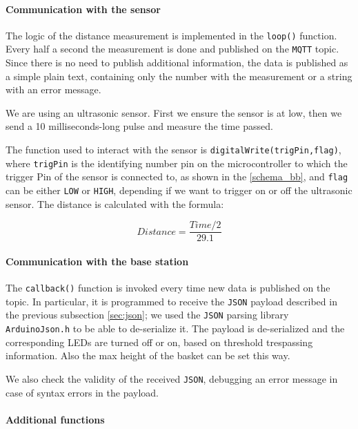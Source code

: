 \documentclass{article}
\begin{document}
\paragraph{Communication with the sensor}\mbox{}

The logic of the distance measurement is implemented in the \verb|loop()|
function. Every half a second the measurement is done and published on the
\texttt{MQTT} topic. Since there is no need to publish additional information, the
data is published as a simple plain text, containing only the number with the
measurement or a string with an error message.

We are using an ultrasonic sensor. First we ensure the sensor is at low, then we
send a 10 milliseconds-long pulse and measure the time passed.

The function used to interact with the sensor is
\verb|digitalWrite(trigPin,flag)|,
where \texttt{trigPin} is the identifying number pin on the
microcontroller to which the trigger Pin of the sensor is connected to, as shown in the \ref{schema_bb}, and \texttt{flag} can be either \texttt{LOW} or \texttt{HIGH}, depending if we want
to trigger on or off the ultrasonic sensor. The distance is calculated with the formula:

\begin{equation}
\mathit{Distance} = \frac{\mathit{Time}/2}{29.1}
\end{equation}

\paragraph{Communication with the base station}\mbox{}

The \verb|callback()| function is invoked every time new data is published on
the topic. In particular, it is programmed to receive the \texttt{JSON} payload
described in the previous subsection \ref{sec:json}; we used the
\texttt{JSON} parsing library \texttt{ArduinoJson.h} to be able to de-serialize
it. The payload is de-serialized and the corresponding LEDs are turned off or on,
based on threshold trespassing information. Also the max height of the basket
can be set this way.

We also check the validity of the received \texttt{JSON}, debugging an error
message in case of syntax errors in the payload.

\paragraph{Additional functions}\mbox{}
\end{document}

